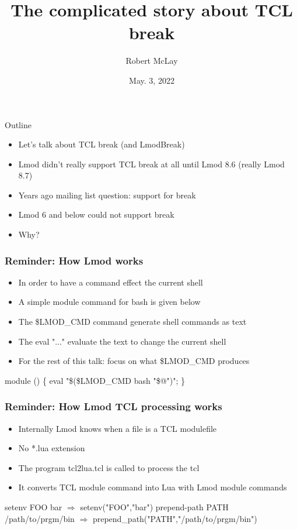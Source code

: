 \documentclass{beamer}
\begin{document}
\title[Lmod]{The complicated story about TCL break}
\author{Robert McLay} 
\date{May. 3, 2022}

\frame{\titlepage} 


\begin{frame}{Outline}
  \begin{itemize}
    \item Let's talk about TCL break (and LmodBreak)
    \item Lmod didn't really support TCL break at all until Lmod 8.6
      (really Lmod 8.7)
    \item Years ago mailing list question: support for break
    \item Lmod 6 and below could not support break
    \item Why?
  \end{itemize}
\end{frame}

\begin{frame}[fragile]
    \frametitle{Reminder: How Lmod works}
  \begin{itemize}
    \item In order to have a command effect the current shell
    \item A simple module command for bash is given below
    \item The \$LMOD\_CMD command generate shell commands as text
    \item The eval "..." evaluate the text to change the current shell
    \item For the rest of this talk: focus on what \$LMOD\_CMD produces
  \end{itemize}
 {\small
    \begin{semiverbatim}
     module () \{ eval "\$(\$LMOD\_CMD bash "\$@")"; \}
    \end{semiverbatim}
}
\end{frame}

\begin{frame}[fragile]
    \frametitle{Reminder: How Lmod TCL processing works}
  \begin{itemize}
    \item Internally Lmod knows when a file is a TCL modulefile 
    \item No *.lua extension
    \item The program tcl2lua.tcl is called to process the tcl 
    \item It converts TCL module command into Lua with Lmod module
      commands
  \end{itemize}
 {\tiny
    \begin{semiverbatim}
setenv FOO bar $\Rightarrow$ setenv("FOO","bar")
prepend-path PATH /path/to/prgm/bin $\Rightarrow$ prepend_path("PATH","/path/to/prgm/bin")
    \end{semiverbatim}
}
\end{frame}
\end{document}
